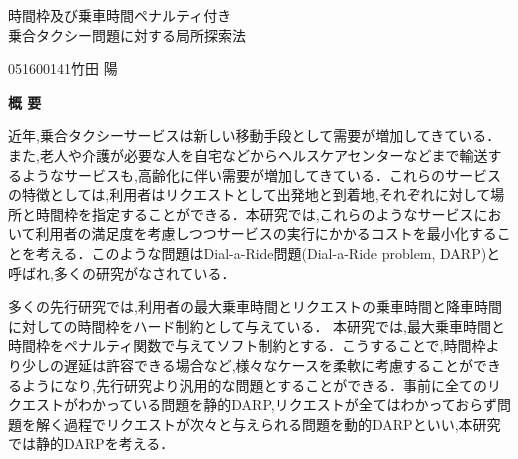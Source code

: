\begin{center}
{\LARGE 時間枠及び乗車時間ペナルティ付き\\乗合タクシー問題に対する局所探索法}\\[0.5cm]
\end{center}
\hfill
{\large 051600141\qquad 竹田 陽}\\[0.5cm]
\begin{center}
{\Large \bf 概 要}\\
\end{center}

近年,乗合タクシーサービスは新しい移動手段として需要が増加してきている．また,老人や介護が必要な人を自宅などからヘルスケアセンターなどまで輸送するようなサービスも,高齢化に伴い需要が増加してきている．これらのサービスの特徴としては,利用者はリクエストとして出発地と到着地,それぞれに対して場所と時間枠を指定することができる．本研究では,これらのようなサービスにおいて利用者の満足度を考慮しつつサービスの実行にかかるコストを最小化することを考える．このような問題はDial-a-Ride問題(Dial-a-Ride problem, DARP)と呼ばれ,多くの研究がなされている．

多くの先行研究では,利用者の最大乗車時間とリクエストの乗車時間と降車時間に対しての時間枠をハード制約として与えている．
本研究では,最大乗車時間と時間枠をペナルティ関数で与えてソフト制約とする．こうすることで,時間枠より少しの遅延は許容できる場合など,様々なケースを柔軟に考慮することができるようになり,先行研究より汎用的な問題とすることができる．事前に全てのリクエストがわかっている問題を静的DARP,リクエストが全てはわかっておらず問題を解く過程でリクエストが次々と与えられる問題を動的DARPといい,本研究では静的DARPを考える．
